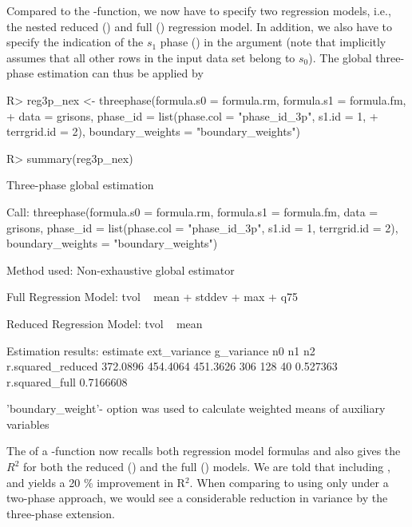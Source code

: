 Compared to the -function, we now have to specify two regression models, i.e., the nested reduced () and full () regression model. In addition, we also have to specify the indication of the $s_1$ phase () in the argument  (note that  implicitly assumes that all other rows in the input data set belong to $s_0$). The global three-phase estimation can thus be applied by

\begin{small}
\begin{Schunk}
\begin{Sinput}
R> reg3p_nex <- threephase(formula.s0 = formula.rm, formula.s1 = formula.fm, 
+    data = grisons, phase_id = list(phase.col = "phase_id_3p", s1.id = 1,  
+    terrgrid.id = 2), boundary_weights = "boundary_weights")
\end{Sinput}
\end{Schunk}
\end{small}

\begin{small}
\begin{Schunk}
\begin{Sinput}
R> summary(reg3p_nex)
\end{Sinput}
\begin{Soutput}
Three-phase global estimation
 
Call: 
threephase(formula.s0 = formula.rm, formula.s1 = formula.fm, 
    data = grisons, phase_id = list(phase.col = "phase_id_3p", 
        s1.id = 1, terrgrid.id = 2), boundary_weights = "boundary_weights")

Method used:
Non-exhaustive global estimator
 
Full Regression Model:
tvol ~ mean + stddev + max + q75

Reduced Regression Model:
tvol ~ mean

Estimation results:
 estimate ext_variance g_variance  n0  n1 n2 r.squared_reduced
 372.0896     454.4064   451.3626 306 128 40          0.527363
 r.squared_full
      0.7166608

'boundary_weight'- option was used to calculate weighted means of auxiliary variables
\end{Soutput}
\end{Schunk}
\end{small}

The  of a -function now recalls both regression model formulas and also gives the $R^2$ for both the reduced () and the full () models. We are told that including ,  and  yields a 20 \% improvement in R$^2$. When comparing to using only  under a two-phase approach, we would see a considerable reduction in variance by the three-phase extension.


